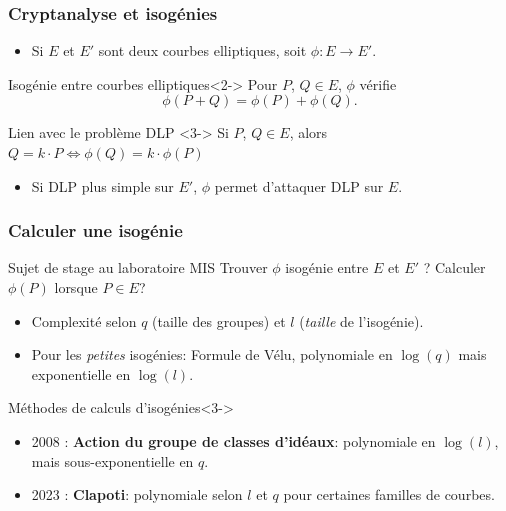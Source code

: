 \documentclass[11pt]{beamer}
\begin{document}
	\begin{frame} 
		\frametitle{Cryptanalyse et isogénies} 
		
		\begin{itemize}
			\item Si $E$ et $E'$ sont deux courbes elliptiques, soit $\phi : E\rightarrow E'$.
		\end{itemize}
			
		\begin{block}{Isogénie entre courbes elliptiques}<2->
			Pour $P$, $Q\in E$, $\phi$ vérifie
			\begin{equation*}
				\phi(P+Q) = \phi(P) + \phi(Q).
			\end{equation*}
		\end{block}
		
		\begin{block}{Lien avec le problème DLP }<3->
			Si $P$, $Q\in E$, alors $Q = k\cdot P\iff \phi(Q) = k\cdot\phi(P)$
		\end{block}
		
		\begin{itemize}
			\item<3-> Si DLP plus simple sur $E'$, $\phi$ permet d'attaquer DLP sur $E$.
		\end{itemize}
		
	\end{frame}
	
	\begin{frame}
		\frametitle{Calculer une isogénie}
		\begin{block}{Sujet de stage au laboratoire MIS}
			Trouver $\phi$ isogénie entre $E$ et $E'$ ? Calculer $\phi(P)$ lorsque $P\in E$?
		\end{block}
		\begin{itemize}
			\item<2-> Complexité selon $q$ (taille des groupes) et $l$ (\textit{taille} de l'isogénie).
			\item<2-> Pour les \textit{petites} isogénies: Formule de Vélu, polynomiale en $\log(q)$ mais exponentielle en $\log(l)$. 
		\end{itemize}
		
		\begin{block}{Méthodes de calculs d'isogénies}<3->
			\begin{itemize}
				\item 2008 : \textbf{Action du groupe de classes d'idéaux}: polynomiale en $\log(l)$, mais sous-exponentielle en $q$. 
				\item 2023 : \textbf{Clapoti}: polynomiale selon $l$ et $q$ pour certaines familles de courbes. 
			\end{itemize}
		\end{block}
	\end{frame}
	
\end{document}
